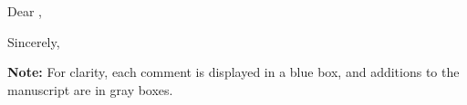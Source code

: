 Dear \editorname,



\vspace{1.2em}

Sincerely,

\vspace{1.5em}

\theauthor

\vfil
\textbf{Note:} For clarity, each comment is displayed in a blue box, and additions to the manuscript are in gray boxes.